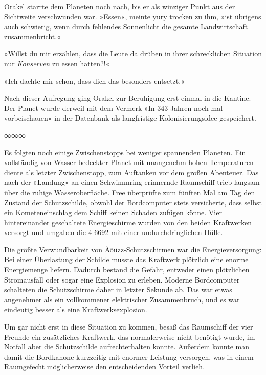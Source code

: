 Orakel starrte dem Planeten noch nach, bis er als winziger Punkt aus der Sichtweite verschwunden war. »Essen«, meinte yury trocken zu ihm, »ist übrigens auch schwierig, wenn durch fehlendes Sonnenlicht die gesamte Landwirtschaft zusammenbricht.«

»Willst du mir erzählen, dass die Leute da drüben in ihrer schrecklichen Situation nur \emph{Konserven} zu essen hatten?!«

»Ich dachte mir schon, dass dich das besonders entsetzt.«

Nach dieser Aufregung ging Orakel zur Beruhigung erst einmal in die Kantine. Der Planet wurde derweil mit dem Vermerk »In 343 Jahren noch mal vorbeischauen« in der Datenbank als langfristige Kolonisierungsidee gespeichert.

\begin{center}
    ∞∞∞
\end{center}

Es folgten noch einige Zwischenstopps bei weniger spannenden Planeten. Ein vollständig von Wasser bedeckter Planet mit unangenehm hohen Temperaturen diente als letzter Zwischenstopp, zum Auftanken vor dem großen Abenteuer. Das nach der »Landung« an einen Schwimmring erinnernde Raumschiff trieb langsam über die ruhige Wasseroberfläche. Free überprüfte zum fünften Mal am Tag den Zustand der Schutzschilde, obwohl der Bordcomputer stets versicherte, dass selbst ein Kometeneinschlag dem Schiff keinen Schaden zufügen könne. Vier hintereinander geschaltete Energieschirme wurden von den beiden Kraftwerken versorgt und umgaben die 4-6692 mit einer undurchdringlichen Hülle.

Die größte Verwundbarkeit von Äöüzz-Schutzschirmen war die Energieversorgung: Bei einer Überlastung der Schilde musste das Kraftwerk plötzlich eine enorme Energiemenge liefern. Dadurch bestand die Gefahr, entweder einen plötzlichen Stromausfall oder sogar eine Explosion zu erleben. Moderne Bordcomputer schalteten die Schutzschirme daher in letzter Sekunde ab. Das war etwas angenehmer als ein vollkommener elektrischer Zusammenbruch, und es war eindeutig besser als eine Kraftwerksexplosion.

Um gar nicht erst in diese Situation zu kommen, besaß das Raumschiff der vier Freunde ein zusätzliches Kraftwerk, das normalerweise nicht benötigt wurde, im Notfall aber die Schutzschilde aufrechterhalten konnte. Außerdem konnte man damit die Bordkanone kurzzeitig mit enormer Leistung versorgen, was in einem Raumgefecht möglicherweise den entscheidenden Vorteil verlieh.


